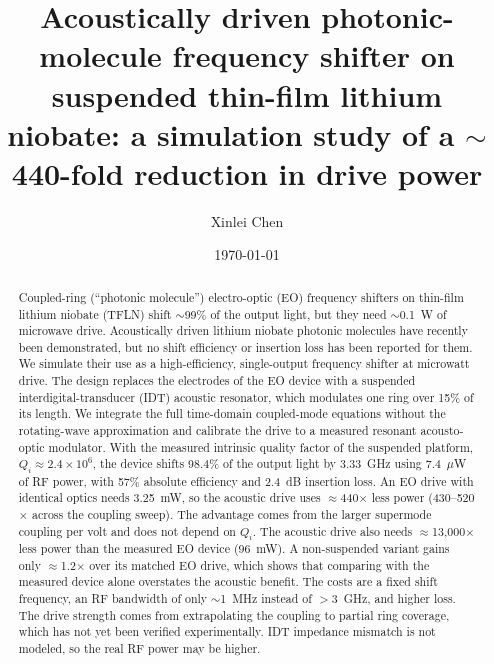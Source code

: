 \documentclass[aps,prl,reprint,superscriptaddress,amsmath,amssymb,floatfix]{revtex4-2}
\begin{document}
\title{Acoustically driven photonic-molecule frequency shifter on suspended thin-film lithium niobate: a simulation study of a $\sim$440-fold reduction in drive power}

\author{Xinlei Chen}

\date{\today}

\begin{abstract}
Coupled-ring (``photonic molecule'') electro-optic (EO) frequency shifters on thin-film lithium niobate (TFLN) shift $\sim$99\% of the output light, but they need $\sim$0.1~W of microwave drive. Acoustically driven lithium niobate photonic molecules have recently been demonstrated, but no shift efficiency or insertion loss has been reported for them. We simulate their use as a high-efficiency, single-output frequency shifter at microwatt drive. The design replaces the electrodes of the EO device with a suspended interdigital-transducer (IDT) acoustic resonator, which modulates one ring over 15\% of its length. We integrate the full time-domain coupled-mode equations without the rotating-wave approximation and calibrate the drive to a measured resonant acousto-optic modulator. With the measured intrinsic quality factor of the suspended platform, $Q_i\approx2.4\times10^6$, the device shifts 98.4\% of the output light by 3.33~GHz using 7.4~$\mu$W of RF power, with 57\% absolute efficiency and 2.4~dB insertion loss. An EO drive with identical optics needs 3.25~mW, so the acoustic drive uses $\approx$440$\times$ less power (430--520$\times$ across the coupling sweep). The advantage comes from the larger supermode coupling per volt and does not depend on $Q_i$. The acoustic drive also needs $\approx$13{,}000$\times$ less power than the measured EO device (96~mW). A non-suspended variant gains only $\approx$1.2$\times$ over its matched EO drive, which shows that comparing with the measured device alone overstates the acoustic benefit. The costs are a fixed shift frequency, an RF bandwidth of only $\sim$1~MHz instead of $>$3~GHz, and higher loss. The drive strength comes from extrapolating the coupling to partial ring coverage, which has not yet been verified experimentally. IDT impedance mismatch is not modeled, so the real RF power may be higher.
\end{abstract}

\maketitle
\end{document}
